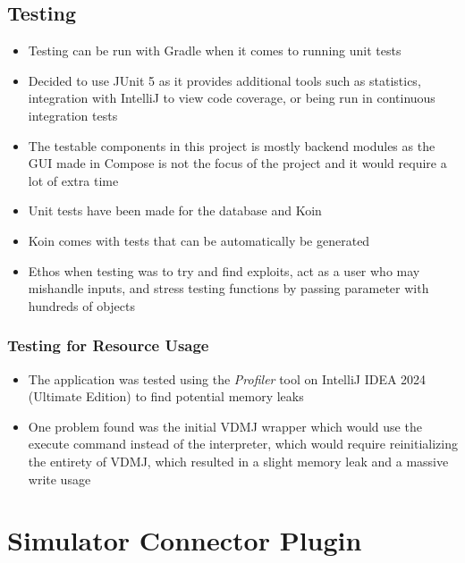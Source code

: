 \documentclass[../dissertation.tex]{subfiles}
\begin{document}
\subsection{Testing}
\begin{itemize}
  \item Testing can be run with Gradle when it comes to running unit tests
  \item Decided to use JUnit 5 as it provides additional tools such as
    statistics, integration with IntelliJ to view code coverage,
    or being run in continuous integration tests
  \item The testable components in this project is mostly backend modules as
    the GUI made in Compose is not the focus of the project and it would
    require a lot of extra time
  \item Unit tests have been made for the database and Koin
  \item Koin comes with tests that can be automatically be generated
  \item Ethos when testing was to try and find exploits, act as a
    user who may mishandle inputs, and stress testing functions
    by passing parameter with hundreds of objects
\end{itemize}

\subsubsection{Testing for Resource Usage}
\begin{itemize}
  \item The application was tested using the \textit{Profiler} tool on
    IntelliJ IDEA 2024 (Ultimate Edition) to find potential
    memory leaks
  \item One problem found was the initial VDMJ wrapper which would use the execute
    command instead of the interpreter, which would require reinitializing
    the entirety of VDMJ, which resulted in a slight memory leak and a
    massive write usage
\end{itemize}



\section{Simulator Connector Plugin}
\end{document}
